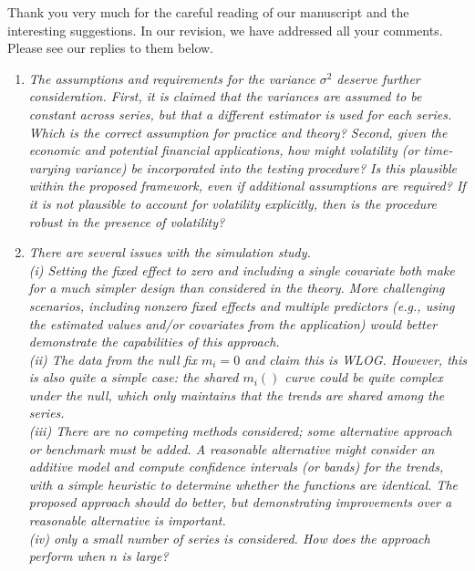 \documentclass[a4paper,12pt]{article}
\begin{document}
Thank you very much for the careful reading of our manuscript and the interesting suggestions. In our revision, we have addressed all your comments. Please see our replies to them below.
\begin{enumerate}[label=\arabic*.,leftmargin=0.6cm]


\item \textit{The assumptions and requirements for the variance $\sigma^2$ deserve further consideration. First, it is claimed that the variances are assumed to be constant across series, but that a different estimator is used for each series. Which is the correct assumption for practice and theory? Second, given the economic and potential financial applications, how might volatility (or time-varying variance) be incorporated into the testing procedure? Is this plausible within the proposed framework, even if additional assumptions are required? If it is not plausible to account for volatility explicitly, then is the procedure robust in the presence of volatility? }


\item \textit{There are several issues with the simulation study. \\
(i) Setting the fixed effect to zero and including a single covariate both make for a much simpler design than considered in the theory. More challenging scenarios, including nonzero fixed effects and multiple predictors (e.g., using the estimated values and/or covariates from the application) would better demonstrate the capabilities of this approach. \\
(ii) The data from the null fix $m_i = 0$ and claim this is WLOG. However, this is also quite a simple case: the shared $m_i()$ curve could be quite complex under the null, which only maintains that the trends are shared among the series. \\
(iii) There are no competing methods considered; some alternative approach or benchmark must be added.  A reasonable alternative might consider an additive model and compute confidence intervals (or bands) for the trends, with a simple heuristic to determine whether the functions are identical. The proposed approach should do better, but demonstrating improvements over a reasonable alternative is important. \\
(iv) only a small number of series is considered. How does the approach perform when $n$ is large? }  

{\color{blue}  
\begin{itemize}[topsep=0pt]
 

\end{itemize}}
\end{enumerate}
\end{document}
